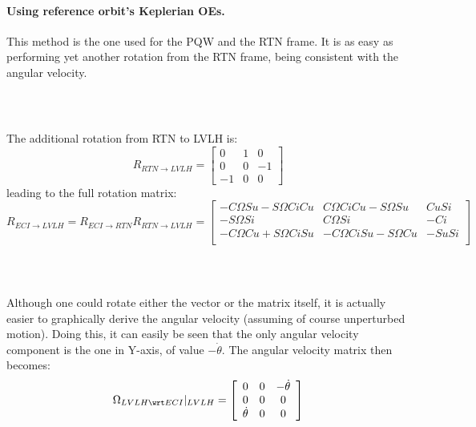 		\paragraph{ Using reference orbit's Keplerian OEs. \\}
		\indent This method is the one used for the PQW and the RTN frame. It is as easy as performing yet another rotation from the RTN frame, being consistent with the angular velocity.
			\subparagraph{  \\}
			\indent The additional rotation from RTN to LVLH is:
			\[
			R_{RTN\to LVLH} = \left[ \begin{array}{ccc}
			0 			& 1 	& 0 \\
			0		    & 0 			& -1 \\
			-1 			& 0 			& 0
			\end{array}\right]
			\]
			\noindent leading to the full rotation matrix:
			\[
			R_{ECI\to LVLH} = R_{ECI\to RTN} R_{RTN\to LVLH} = \left[ \begin{array}{ccc}
			-C\Omega S u - S\Omega C i C u 			& C\Omega C i C u - S\Omega S u		& C u S i\\
			-S\Omega S i		    				& C\Omega S i 						& -C i \\
			-C\Omega C u + S\Omega C i S u 			& -C\Omega C i S u - S\Omega C u	& -S u S i\\
			\end{array}\right]
			\]
			\subparagraph{ \\}
			\indent Although one could rotate either the vector or the matrix itself, it is actually easier to graphically derive the angular velocity (assuming of course unperturbed motion). Doing this, it can easily be seen that the only angular velocity component is the one in Y-axis, of value $-\dot{\theta}$. The angular velocity matrix then becomes:
			\[
			\Omega_{LVLH\wrt ECI}\rvert_{LVLH} = \left[ \begin{array}{ccc}
			0 			& 0 			& -\dot{\theta}\\
			0 			& 0 			& 0 \\
			\dot{\theta}	& 0 			& 0
			\end{array}\right]
			\]
